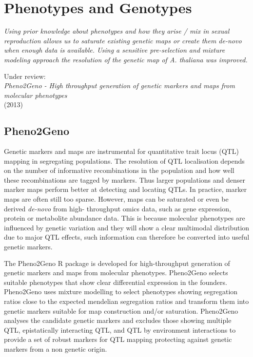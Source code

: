 \chapter{Phenotypes and Genotypes}

\emph{Using prior knowledge about phenotypes and how they arise / mix in sexual reproduction allows us 
to saturate existing genetic maps or create them de-novo when enough data is available. Using a sensitive 
pre-selection and mixture modeling approach the resolution of the genetic map of A. thaliana was improved.}

\null
\vfill

\begin{myexampleblock}{Under review:}
  \\
  \emph{Pheno2Geno - High throughput generation of genetic markers and maps from molecular phenotypes}\\
   (2013)
\end{myexampleblock}
\newpage

\section{Pheno2Geno}
Genetic markers and maps are instrumental for quantitative trait locus (QTL) mapping in segregating 
populations. The resolution of QTL localisation depends on the number of informative recombinations 
in the population and how well these recombinations are tagged by markers. Thus larger populations 
and denser marker maps perform better at detecting and locating QTLs. In practice, marker maps are 
often still too sparse. However, maps can be saturated or even be derived \emph{de-novo} from high-
throughput omics data, such as gene expression, protein or metabolite abundance data. This is because 
molecular phenotypes are influenced by genetic variation and they will show a clear multimodal 
distribution due to major QTL effects, such information can therefore be converted into useful 
genetic markers.

The Pheno2Geno R package is developed for high-throughput generation of genetic markers and maps from 
molecular phenotypes. Pheno2Geno selects suitable phenotypes that show clear differential expression 
in the founders. Pheno2Geno uses mixture modelling to select phenotypes showing segregation ratios 
close to the expected mendelian segregation ratios and transform them into genetic markers suitable 
for map construction and/or saturation. Pheno2Geno analyses the candidate genetic markers and excludes 
those showing multiple QTL, epistatically interacting QTL, and QTL by environment interactions to 
provide a set of robust markers for QTL mapping protecting against genetic markers from a non genetic 
origin.

